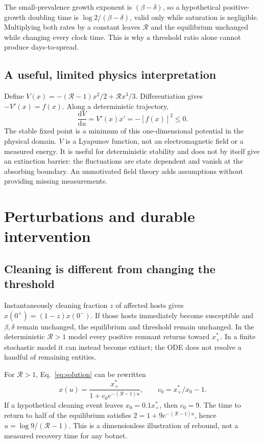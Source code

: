 \documentclass[11pt]{article}
\newcommand{\dd}{\mathrm d}
\newcommand{\R}{\mathcal R}
\begin{document}
The small-prevalence growth exponent is $(\beta-\delta)$, so a hypothetical positive-growth doubling time is $\log2/(\beta-\delta)$, valid only while saturation is negligible. Multiplying both rates by a constant leaves $\R$ and the equilibrium unchanged while changing every clock time. This is why a threshold ratio alone cannot produce days-to-spread.

\subsection{A useful, limited physics interpretation}
Define $V(x)=-(\R-1)x^2/2+\R x^3/3$. Differentiation gives $-V'(x)=f(x)$. Along a deterministic trajectory,
\begin{equation}
\frac{\dd V}{\dd u}=V'(x)x'=-[f(x)]^2\le0.
\end{equation}
The stable fixed point is a minimum of this one-dimensional potential in the physical domain. $V$ is a Lyapunov function, not an electromagnetic field or a measured energy. It is useful for deterministic stability and does not by itself give an extinction barrier: the fluctuations are state dependent and vanish at the absorbing boundary. An unmotivated field theory adds assumptions without providing missing measurements.

\section{Perturbations and durable intervention}
\subsection{Cleaning is different from changing the threshold}
Instantaneously cleaning fraction $z$ of affected hosts gives $x(0^+)=(1-z)x(0^-)$. If those hosts immediately become susceptible and $\beta,\delta$ remain unchanged, the equilibrium and threshold remain unchanged. In the deterministic $\R>1$ model every positive remnant returns toward $x_+^*$. In a finite stochastic model it can instead become extinct; the ODE does not resolve a handful of remaining entities.

For $\R>1$, Eq.~\eqref{eq:solution} can be rewritten
\begin{equation}
x(u)=\frac{x_+^*}{1+c_0e^{-(\R-1)u}},\qquad c_0=x_+^*/x_0-1.
\end{equation}
If a hypothetical cleaning event leaves $x_0=0.1x_+^*$, then $c_0=9$. The time to return to half of the equilibrium satisfies $2=1+9e^{-(\R-1)u}$, hence $u=\log9/(\R-1)$. This is a dimensionless illustration of rebound, not a measured recovery time for any botnet.
\end{document}
